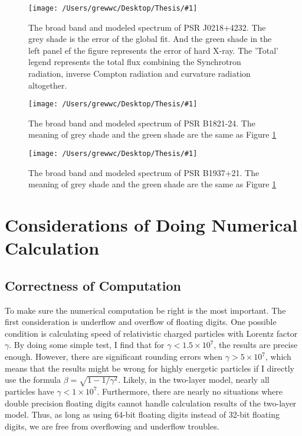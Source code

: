 \documentclass[12pt]{report}
\newcommand{\singleFig}[3]{
  \begin{figure}[!htp]
    \centering
    \texttt{[image: /Users/grewwc/Desktop/Thesis/\#1]}
    \caption{#3}
    \label{fig: #1}
  \end{figure}
}
\begin{document}
        \singleFig{j0218_twolayer_all.png}{0.37}{The broad band and modeled spectrum of PSR J0218+4232.
          The grey shade is the error of the global fit. And the green shade in the left panel ef the 
          figure represents the error of hard X-ray. The 'Total' legend represents the total flux 
          combining the Synchrotron radiation, inverse Compton radiation and curvature radiation
          altogether.}
        \vspace{0.5cm} 
        
        \singleFig{b1821_twolayer_all.png}{0.37}{The broad band and modeled spectrum of PSR B1821-24.
          The meaning of grey shade and the green shade are the same as Figure \ref{fig: j0218_twolayer_all.png}}
        \vspace{0.5cm} 
          
        \singleFig{j1939_twolayer_all_ave.png}{0.39}{The broad band and modeled spectrum of PSR B1937+21.
          The meaning of grey shade and the green shade are the same as Figure
          \ref{fig: j0218_twolayer_all.png}}
        \vspace{0.5cm}        

      \section{Considerations of Doing Numerical Calculation}
        \subsection{Correctness of Computation}
          To make sure the numerical computation be right is the most important. 
          The first consideration is underflow and overflow of floating digits.
          One possible condition is calculating speed of relativistic charged particles with 
          Lorentz factor $\gamma$. By doing some simple test, I find that for 
          $\gamma < 1.5\times 10^7$, the results are precise enough. However, there are 
          significant rounding errors when $\gamma > 5\times 10^7$, which means that the 
          results might be wrong for highly energetic particles if I directly use the formula 
          $\beta = \sqrt{1 - 1/\gamma^2}$.
          Likely, in the two-layer model, nearly all particles have $\gamma < 1\times 10^7$. 
          Furthermore, there are nearly no situations where double precision floating digits
          cannot handle calculation results of the two-layer model. Thus, as long as using 
          64-bit floating digits instead of 32-bit floating digits, we are free from overflowing 
          and underflow troubles. 
            
\end{document}
